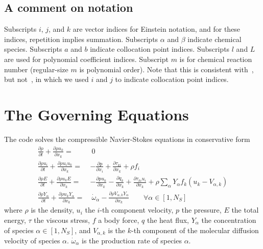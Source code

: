 \documentclass[notitlepage]{revtex4-1}
\begin{document}
\subsection{A comment on notation}

Subscripts $i$, $j$, and $k$ are vector indices for Einstein notation, and for these indices, repetition implies summation. Subscripts $\alpha$ and $\beta$ indicate chemical species. Subscripts $a$ and $b$ indicate collocation point indices. Subscripts $l$ and $L$ are used for polynomial coefficient indices. Subscript $m$ is for chemical reaction number (regular-size $m$ is polynomial order). Note that this is consistent with~\cite{king_2023}, but not~\cite{king_2020,king_2022}, in which we used $i$ and $j$ to indicate collocation point indices.

\section{The Governing Equations}\label{ge}

The code solves the compressible Navier-Stokes equations in conservative form
\begin{subequations}\begin{align}
\frac{\partial\rho}{\partial{t}}+\frac{\partial\rho{u}_{k}}{\partial{x}_{k}}=&~0\label{eq:mass}\\
\frac{\partial\rho{u}_{i}}{\partial{t}}+\frac{\partial\rho{u}_{i}u_{k}}{\partial{x}_{k}}=&-\frac{\partial{p}}{\partial{x}_{i}}+\frac{\partial\tau_{ki}}{\partial{x}_{k}}+\rho{f}_{i}\label{eq:mom}\\
\frac{\partial\rho{E}}{\partial{t}}+\frac{\partial\rho{u}_{k}E}{\partial{x}_{k}}=&-\frac{\partial{p}u_{k}}{\partial{x}_{k}}-\frac{\partial{q}_{k}}{\partial{x}_{k}}+\frac{\partial\tau_{ki}u_{i}}{\partial{x}_{k}}+\rho\displaystyle\sum_{\alpha}Y_{\alpha}f_{k}\left({u}_{k}-V_{\alpha,k}\right)\label{eq:en}\\
\frac{\partial\rho{Y}_{\alpha}}{\partial{t}}+\frac{\partial\rho{u}_{k}Y_{\alpha}}{\partial{x}_{k}}=&~\dot\omega_{\alpha}-\frac{\partial\rho{V}_{\alpha,k}Y_{\alpha}}{\partial{x}_{k}}\qquad\forall\alpha\in\left[1,N_{S}\right]\label{eq:Y}
\end{align}
\end{subequations}
where $\rho$ is the density, ${u}_{i}$ the $i$-th component velocity, $p$ the pressure, $E$ the total energy, $\tau$ the viscous stress, $f$ a body force, $q$ the heat flux, $Y_{\alpha}$ the concentration of species $\alpha\in\left[1,N_{S}\right]$, and $V_{\alpha,k}$ is the $k$-th component of the molecular diffusion velocity of species $\alpha$. $\dot\omega_{\alpha}$ is the production rate of species $\alpha$.
\end{document}
